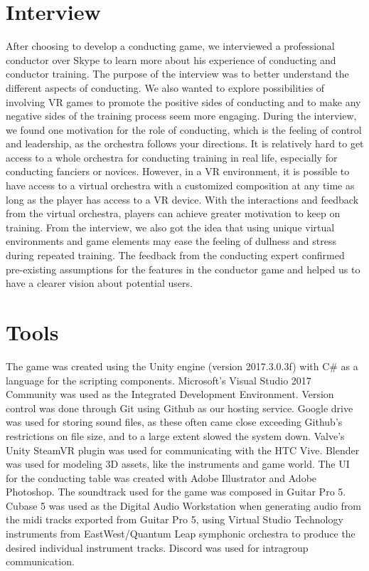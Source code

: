 \section{Interview}
After choosing to develop a conducting game, we interviewed a professional conductor over Skype to learn more about his experience of conducting and conductor training. The purpose of the interview was to better understand the different aspects of conducting. We also wanted to explore possibilities of involving VR games to promote the positive sides of conducting and to make any negative sides of the training process seem more engaging. During the interview, we found one motivation for the role of conducting, which is the feeling of control and leadership, as the orchestra follows your directions. It is relatively hard to get access to a whole orchestra for conducting training in real life, especially for conducting fanciers or novices. However, in a VR environment, it is possible to have access to a virtual orchestra with a customized composition at any time as long as the player has access to a VR device. With the interactions and feedback from the virtual orchestra, players can achieve greater motivation to keep on training. From the interview, we also got the idea that using unique virtual environments and game elements may ease the feeling of dullness and stress during repeated training. The feedback from the conducting expert confirmed pre-existing assumptions for the features in the conductor game and helped us to have a clearer vision about potential users.

\section{Tools}
The game was created using the Unity engine (version 2017.3.0.3f) with C\# as a language for the scripting components. Microsoft's Visual Studio 2017 Community was used as the Integrated Development Environment. Version control was done through Git using Github as our hosting service. Google drive was used for storing sound files, as these often came close exceeding Github’s restrictions on file size, and to a large extent slowed the system down.
Valve’s Unity SteamVR plugin was used for communicating with the HTC Vive. Blender was used for modeling 3D assets, like the instruments and game world. The UI for the conducting table was created with Adobe Illustrator and Adobe Photoshop. The soundtrack used for the game was composed in Guitar Pro 5. Cubase 5 was used as the Digital Audio Workstation when generating audio from the midi tracks exported from Guitar Pro 5, using Virtual Studio Technology instruments from EastWest/Quantum Leap symphonic orchestra to produce the desired individual instrument tracks. Discord was used for intragroup communication.


